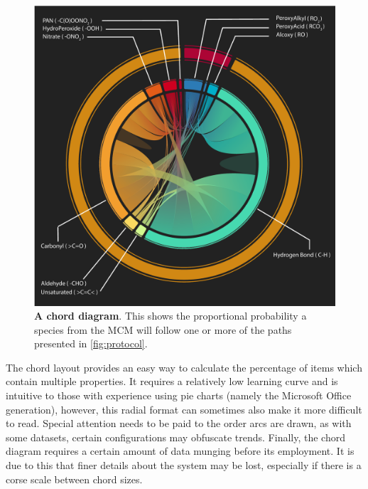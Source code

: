 \begin{figure}[H]
     \centering
     \includegraphics[width=\textwidth]{figures_c1/radicallayermcmgen.pdf}
        \caption{\textbf{A chord diagram}. This shows the proportional probability a species from the MCM will follow one or more of the paths presented in \autoref{fig:protocol}.}
        \label{fig:chord}
\end{figure}


The chord layout provides an easy way to calculate the percentage of items which contain multiple properties. It requires a relatively low learning curve and is intuitive to those with experience using pie charts (namely the Microsoft Office generation), however, this radial format can sometimes also make it more difficult to read. Special attention needs to be paid to the order arcs are drawn, as with some datasets, certain configurations may obfuscate trends. Finally, the chord diagram requires a certain amount of data munging before its employment. It is due to this that finer details about the system may be lost, especially if there is a corse scale between chord sizes. 










